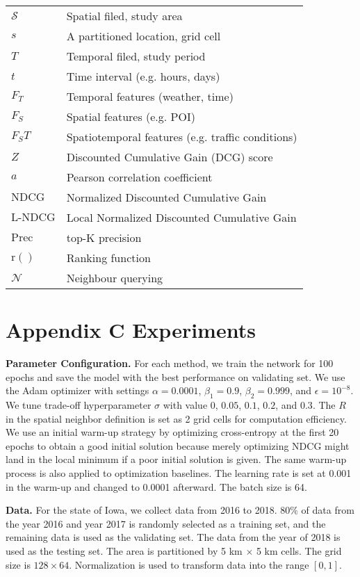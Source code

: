 \documentclass{article}
\def \S {\mathbf{S}}
\def \S {\mathcal{S}}
\def \N {\mathcal{N}}
\begin{document}
{\begin{tabular}{ |p{2cm}|p{9cm}|  }
\hline
$\S$ & Spatial filed, study area \\
$s$  &  A partitioned location, grid cell   \\
$T$  &    Temporal filed, study period \\
$t$  &    Time interval (e.g. hours, days) \\
$F_T$  & Temporal features (weather, time)    \\
$F_S$  &   Spatial features (e.g. POI) \\
$F_ST$  &    Spatiotemporal features (e.g. traffic conditions)\\
$Z$  &    Discounted Cumulative Gain (DCG) score \\ 
$a$  &   Pearson correlation coefficient\\ 
$\text{NDCG}$  &  Normalized Discounted Cumulative Gain    \\
$\text{L-NDCG}$  &  Local Normalized Discounted Cumulative Gain   \\
$\text{Prec}$  &  top-K precision   \\
$\text{r}()$  & Ranking function    \\
$\N$  &   Neighbour querying  \\
\hline
\end{tabular}
\setlength{\extrarowheight}{-.5em}

\section{Appendix C Experiments}
\textbf{Parameter Configuration.} For each method, we train the network for 100 epochs and save the model with the best performance on validating set. We use the Adam optimizer \cite{KingmaDiederikP2014AAMf} with settings $\alpha=0.0001$, $\beta_1=0.9$, $\beta_2=0.999$, and $\epsilon=10^{-8}$. We tune trade-off hyperparameter $\sigma$ with value $0$, $0.05$, $0.1$, $0.2$, and $0.3$. The $R$ in the spatial neighbor definition is set as 2 grid cells for computation efficiency. We use an initial warm-up strategy by optimizing cross-entropy at the first 20 epochs to obtain a good initial solution because merely optimizing NDCG might land in the local minimum if a poor initial solution is given. The same warm-up process is also applied to optimization baselines. 
The learning rate is set at 0.001 in the warm-up and changed to 0.0001 afterward. The batch size is 64. 

\textbf{Data.} For the state of Iowa, we collect data from 2016 to 2018. $80\%$ of data from the year 2016 and year 2017 is randomly selected as a training set, and the remaining data is used as the validating set. The data from the year of 2018 is used as the testing set. The area is partitioned by 5 km $\times$ 5 km cells. The grid size is $128 \times 64$. Normalization is used to transform data into the range $[0, 1]$. 

}
\end{document}
